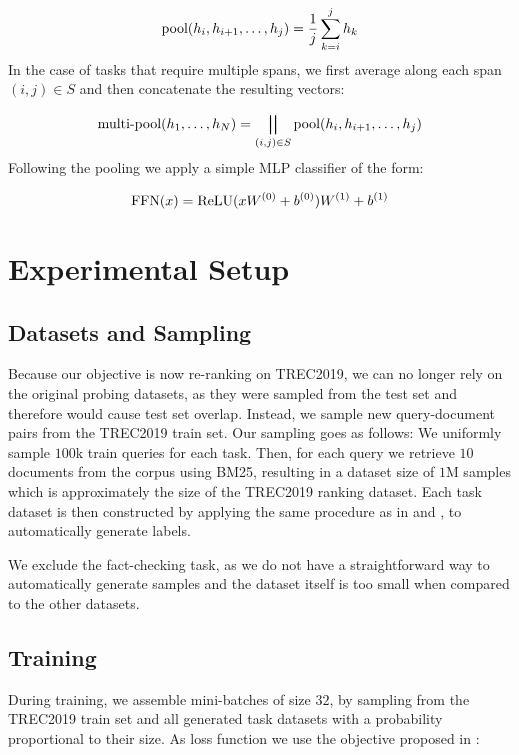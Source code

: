 \begin{equation}
    \text{pool}(h_i, h_{i+1},\dots, h_j)= \frac{1}{j} \sum_{k=i}^j h_k
\end{equation}
In the case of tasks that require multiple spans, we first average along each span $(i,j) \in S$ and then concatenate the resulting vectors:

\begin{equation}
    \text{multi-pool}(h_1, \dots, h_N) = \bigparallel_{(i, j) \in S}{\text{pool}(h_i, h_{i+1},\dots, h_j)}
\end{equation}
Following the pooling we apply a simple MLP classifier of the form:

\begin{equation}
    \text{FFN}(x) = \text{ReLU}(x W^{(0)} + b^{(0)}) W^{(1)} + b^{(1)}
\end{equation}


\section{Experimental Setup}
\subsection{Datasets and Sampling}
Because our objective is now re-ranking on TREC2019, we can no longer rely on the original probing datasets, as they were sampled from the test set and therefore would cause test set overlap. Instead, we sample new query-document pairs from the TREC2019 train set. Our sampling goes as follows: We uniformly sample $100$k train queries for each task. Then, for each query we retrieve $10$ documents from the corpus using BM25, resulting in a dataset size of $1$M samples which is approximately the size of the TREC2019 ranking dataset. Each task dataset is then constructed by applying the same procedure as in  and , to automatically generate labels.

We exclude the fact-checking task, as we do not have a straightforward way to automatically generate samples and the dataset itself is too small when compared to the other datasets.

\subsection{Training}
During training, we assemble mini-batches of size $32$, by sampling from the TREC2019 train set and all generated task datasets with a probability proportional to their size. As loss function we use the objective proposed in \citep{aghajanyan-etal-2021-muppet}:


